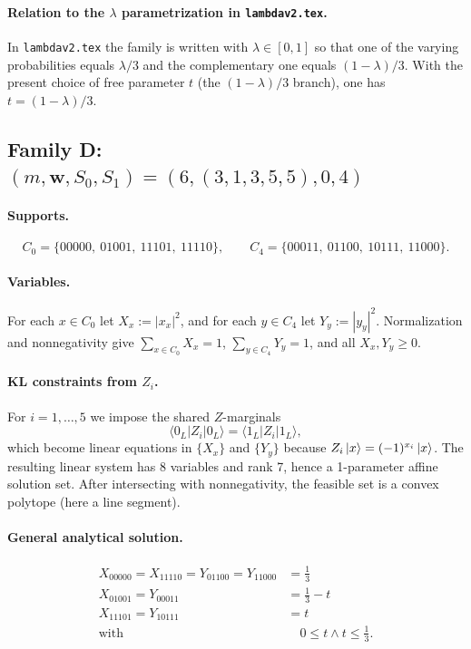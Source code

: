 \documentclass[11pt]{article}
\begin{document}
\paragraph{Relation to the $\lambda$ parametrization in \texttt{lambdav2.tex}.}
In \texttt{lambdav2.tex} the family is written with $\lambda\in[0,1]$ so that one of the varying probabilities equals $\lambda/3$ and the complementary one equals $(1-\lambda)/3$. With the present choice of free parameter $t$ (the $(1-\lambda)/3$ branch), one has $t=(1-\lambda)/3$.


\subsection{Family D: $(m,\mathbf w,S_0,S_1)=(6,(3,1,3,5,5),0,4)$}

\paragraph{Supports.}
\[
C_0 = \{00000,\ 01001,\ 11101,\ 11110\},\qquad C_4 = \{00011,\ 01100,\ 10111,\ 11000\}.
\]

\paragraph{Variables.}
For each $x\in C_0$ let $X_x:=|x_x|^2$, and for each $y\in C_4$ let $Y_y:=|y_y|^2$.
Normalization and nonnegativity give $\sum_{x\in C_0}X_x=1$, $\sum_{y\in C_4}Y_y=1$, and all $X_x,Y_y\ge 0$.

\paragraph{KL constraints from $Z_i$.}
For $i=1,\dots,5$ we impose the shared $Z$-marginals
\[
\langle 0_L|Z_i|0_L\rangle=\langle 1_L|Z_i|1_L\rangle,
\]
which become linear equations in $\{X_x\}$ and $\{Y_y\}$ because $Z_i\ket{x}=(-1)^{x_i}\ket{x}$.
The resulting linear system has 8 variables and rank 7, hence a 1-parameter affine solution set. After intersecting with nonnegativity, the feasible set is a convex polytope (here a line segment).

\paragraph{General analytical solution.}
\[
\begin{aligned}
X_{00000} = X_{11110} = Y_{01100} = Y_{11000} &= \frac{1}{3}\\
X_{01001} = Y_{00011} &= \frac{1}{3} - t\\
X_{11101} = Y_{10111} &= t\\
\text{with }&\quad 0 \leq t \wedge t \leq \frac{1}{3}.
\end{aligned}
\]
\end{document}
